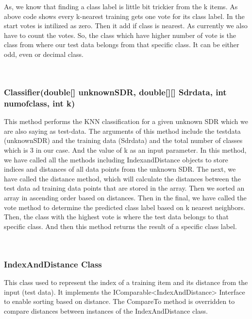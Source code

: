\documentclass[conference]{IEEEtran}
\begin{document}
As, we know that finding a class label is little bit trickier from the k items. As above code shows every k-nearest training gets one vote for its class label. In the start votes is intilized as zero. Then it add if class is nearest.  As currently we also have to count the votes. So, the class which have higher number of vote is the class from where our test data belongs from that specific class. It can be either odd, even or decimal class. 



\

\subsubsection{Classifier(double[] unknownSDR, double[][] Sdrdata, int numofclass, int k)}
This method performs the KNN classification for a given unknown SDR which we are also saying as test-data. The arguments of this method include the testdata (unknownSDR) and the training data (Sdrdata) and the total number of classes which is 3 in our case. And the value of k as an input parameter. In this method, we have called all the methods including IndexandDistance objects to store indices and distances of all data points from the unknown SDR. The next, we have called the distance method, which will calculate the distances between the test data ad training data points that are stored in the array. Then we sorted an array in ascending order based on distances. Then in the final, we have called the vote method to determine the predicted class label based on k nearest neighbors. Then, the class with the highest vote is where the test data belongs to that specific class. And then this method returns the result of a specific class label. 

\
\subsubsection{IndexAndDistance Class}
This class used to represent the index of a training item and its distance from the input (test data). It implements the IComparable<IndexAndDistance> Interface to enable sorting based on distance. The CompareTo method is overridden to compare distances between instances of the IndexAndDistance class.
\end{document}
